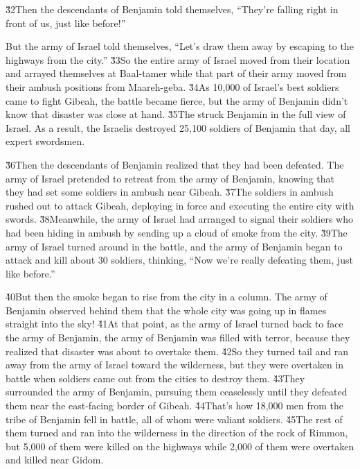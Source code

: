 \v{32}Then the descendants of Benjamin told themselves, ``They're falling right in front of us, just like before!''

But the army of Israel told themselves, ``Let's draw them away by escaping to the highways from the city.'' \v{33}So the entire army of Israel moved from their location and arrayed themselves at Baal-tamer while that part of their army moved from their ambush positions from Maareh-geba. \v{34}As 10,000 of Israel's best soldiers came to fight Gibeah, the battle became fierce, but the army of Benjamin didn't know that disaster was close at hand. \v{35}The  struck Benjamin in the full view of Israel. As a result, the Israelis destroyed 25,100 soldiers of Benjamin that day, all expert swordsmen.

\v{36}Then the descendants of Benjamin realized that they had been defeated. The army of Israel pretended to retreat from the army of Benjamin, knowing that they had set some soldiers in ambush near Gibeah. \v{37}The soldiers in ambush rushed out to attack Gibeah, deploying in force and executing the entire city with swords. \v{38}Meanwhile, the army of Israel had arranged to signal their soldiers who had been hiding in ambush by sending up a cloud of smoke from the city. \v{39}The army of Israel turned around in the battle, and the army of Benjamin began to attack and kill about 30 soldiers, thinking, ``Now we're really defeating them, just like before.''

\v{40}But then the smoke began to rise from the city in a column. The army of Benjamin observed behind them that the whole city was going up in flames straight into the sky! \v{41}At that point, as the army of Israel turned back to face the army of Benjamin, the army of Benjamin was filled with terror, because they realized that disaster was about to overtake them. \v{42}So they turned tail and ran away from the army of Israel toward the wilderness, but they were overtaken in battle when soldiers came out from the cities to destroy them. \v{43}They surrounded the army of Benjamin, pursuing them ceaselessly until they defeated them near the east-facing border of Gibeah. \v{44}That's how 18,000 men from the tribe of Benjamin fell in battle, all of whom were valiant soldiers. \v{45}The rest of them turned and ran into the wilderness in the direction of the rock of Rimmon, but 5,000 of them were killed on the highways while 2,000 of them were overtaken and killed near Gidom.

